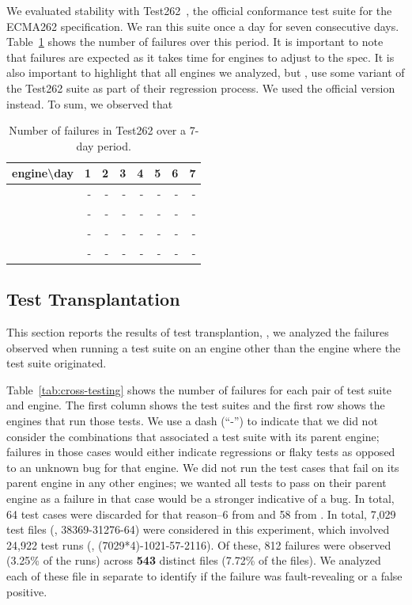 \documentclass[10pt,conference,anonymous]{IEEEtran}
\begin{document}
We evaluated stability with Test262~\cite{ecma262-conformance-suite},
the official \js{} conformance test suite for the ECMA262
specification. We ran this suite once a day for seven consecutive
days. Table~\ref{tab:test262} shows the number of failures over this
period. It is important to note that failures are expected as it takes
time for engines to adjust to the spec. It is also important to
highlight that all engines we analyzed, but \chakra{}, use some
variant of the Test262 suite as part of their regression
process. We used the official version
instead. To sum, we observed
that  

\begin{table}[h]
  \centering
  \caption{\label{tab:test262}Number of failures in Test262 over
    a 7-day period.}
  \begin{tabular}{crrrrrrr}
    \toprule
    engine\textbackslash{}day& 1 & 2 & 3 & 4 & 5 & 6 & 7 \\
    \midrule
    \jsc{} & - & - & - & - & - & - & - \\
    \veight{} & - & - & - & - & - & - & - \\
    \chakra{} & - & - & - & - & - & - & - \\
    \smonkey{} & - & - & - & - & - & - & - \\
    \bottomrule 
  \end{tabular}
\end{table}



\subsection{Test Transplantation}
\label{sec:transplantation}

This section reports the results of test transplantion, \ie{}, we
analyzed the failures observed when running a test suite on an engine
other than the engine where the test suite
originated.

Table~\ref{tab:cross-testing} shows the number of failures for each
pair of test suite and engine. The first column shows the test suites
and the first row shows the engines that run those tests. We use a
dash (``-'') to indicate that we did not consider the combinations
that associated a test suite with its parent engine; failures in those
cases would either indicate regressions or flaky tests as opposed to
an unknown bug for that engine. We did not run the test cases that
fail on its parent engine in any other engines; we wanted all tests to
pass on their parent engine as a failure in that case would be a
stronger indicative of a bug. In total, 64 test cases were discarded
for that reason--6 from \jsc{} and 58 from \smonkey. In total, 7,029
test files (\ie{}, 38369-31276-64) were considered in this experiment,
which involved 24,922 test runs (\ie, (7029*4)-1021-57-2116).  Of
these, 812 failures were observed (3.25\% of the runs) across
\textbf{543} distinct files (7.72\% of the files). We analyzed each of
these file in separate to identify if the failure was fault-revealing
or a false positive.
\end{document}
